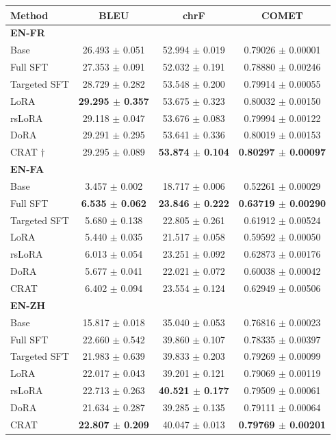 \begingroup
\fontsize{7}{8.4}\selectfont
\setlength{\tabcolsep}{3pt}
\begin{tabular}{lccc}
\toprule
\textbf{Method} & \textbf{BLEU} & \textbf{chrF} & \textbf{COMET} \\
\midrule
\multicolumn{4}{l}{\textbf{EN-FR}} \\
Base & 26.493 $\pm$ 0.051 & 52.994 $\pm$ 0.019 & 0.79026 $\pm$ 0.00001 \\
Full SFT & 27.353 $\pm$ 0.091 & 52.032 $\pm$ 0.191 & 0.78880 $\pm$ 0.00246 \\
Targeted SFT & 28.729 $\pm$ 0.282 & 53.548 $\pm$ 0.200 & 0.79914 $\pm$ 0.00055 \\
LoRA & \textbf{29.295 $\pm$ 0.357} & 53.675 $\pm$ 0.323 & 0.80032 $\pm$ 0.00150 \\
rsLoRA & 29.118 $\pm$ 0.047 & 53.676 $\pm$ 0.083 & 0.79994 $\pm$ 0.00122 \\
DoRA & 29.291 $\pm$ 0.295 & 53.641 $\pm$ 0.336 & 0.80019 $\pm$ 0.00153 \\
CRAT $\dagger$ & 29.295 $\pm$ 0.089 & \textbf{53.874 $\pm$ 0.104} & \textbf{0.80297 $\pm$ 0.00097} \\
\multicolumn{4}{l}{\textbf{EN-FA}} \\
Base & 3.457 $\pm$ 0.002 & 18.717 $\pm$ 0.006 & 0.52261 $\pm$ 0.00029 \\
Full SFT & \textbf{6.535 $\pm$ 0.062} & \textbf{23.846 $\pm$ 0.222} & \textbf{0.63719 $\pm$ 0.00290} \\
Targeted SFT & 5.680 $\pm$ 0.138 & 22.805 $\pm$ 0.261 & 0.61912 $\pm$ 0.00524 \\
LoRA & 5.440 $\pm$ 0.035 & 21.517 $\pm$ 0.058 & 0.59592 $\pm$ 0.00050 \\
rsLoRA & 6.013 $\pm$ 0.054 & 23.251 $\pm$ 0.092 & 0.62873 $\pm$ 0.00176 \\
DoRA & 5.677 $\pm$ 0.041 & 22.021 $\pm$ 0.072 & 0.60038 $\pm$ 0.00042 \\
CRAT & 6.402 $\pm$ 0.094 & 23.554 $\pm$ 0.124 & 0.62949 $\pm$ 0.00506 \\
\multicolumn{4}{l}{\textbf{EN-ZH}} \\
Base & 15.817 $\pm$ 0.018 & 35.040 $\pm$ 0.053 & 0.76816 $\pm$ 0.00023 \\
Full SFT & 22.660 $\pm$ 0.542 & 39.860 $\pm$ 0.107 & 0.78335 $\pm$ 0.00397 \\
Targeted SFT & 21.983 $\pm$ 0.639 & 39.833 $\pm$ 0.203 & 0.79269 $\pm$ 0.00099 \\
LoRA & 22.017 $\pm$ 0.043 & 39.201 $\pm$ 0.121 & 0.79069 $\pm$ 0.00119 \\
rsLoRA & 22.713 $\pm$ 0.263 & \textbf{40.521 $\pm$ 0.177} & 0.79509 $\pm$ 0.00061 \\
DoRA & 21.634 $\pm$ 0.287 & 39.285 $\pm$ 0.135 & 0.79111 $\pm$ 0.00064 \\
CRAT & \textbf{22.807 $\pm$ 0.209} & 40.047 $\pm$ 0.013 & \textbf{0.79769 $\pm$ 0.00201} \\
\bottomrule
\end{tabular}
\endgroup
